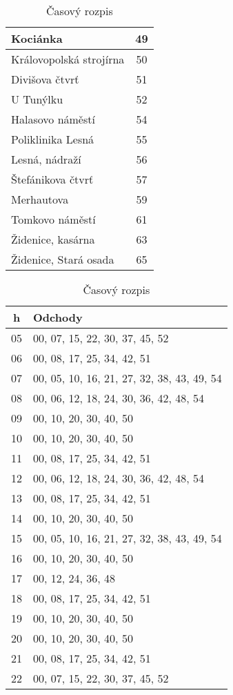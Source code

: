 \begin{table}[h]
\begin{minipage}{0.35\textwidth}
\begin{tabular}{|l|c|}
      Kociánka & 49 \\ \hline
      Královopolská strojírna & 50 \\ \hline
      Divišova čtvrť & 51 \\ \hline
      U Tunýlku & 52 \\ \hline
      Halasovo náměstí & 54 \\ \hline
      Poliklinika Lesná & 55 \\ \hline
      Lesná, nádraží & 56 \\ \hline
      Štefánikova čtvrť & 57 \\ \hline
      Merhautova & 59 \\ \hline
      Tomkovo náměstí & 61 \\ \hline
      Židenice, kasárna & 63 \\ \hline
      Židenice, Stará osada & 65 \\ \hline
    \end{tabular}
    \caption{Rozpis zastávok}      
  \end{minipage}
  \begin{minipage}{0.55\textwidth}
    \centering
    \begin{tabular}{|c|l|}
      \hline
      \textbf{h} & \textbf{Odchody} \\ \hline
      05 & 00, 07, 15, 22, 30, 37, 45, 52 \\ \hline
      06 & 00, 08, 17, 25, 34, 42, 51 \\ \hline
      07 & 00, 05, 10, 16, 21, 27, 32, 38, 43, 49, 54 \\ \hline
      08 & 00, 06, 12, 18, 24, 30, 36, 42, 48, 54 \\ \hline
      09 & 00, 10, 20, 30, 40, 50 \\ \hline
      10 & 00, 10, 20, 30, 40, 50 \\ \hline
      11 & 00, 08, 17, 25, 34, 42, 51 \\ \hline
      12 & 00, 06, 12, 18, 24, 30, 36, 42, 48, 54 \\ \hline
      13 & 00, 08, 17, 25, 34, 42, 51 \\ \hline
      14 & 00, 10, 20, 30, 40, 50 \\ \hline
      15 & 00, 05, 10, 16, 21, 27, 32, 38, 43, 49, 54 \\ \hline
      16 & 00, 10, 20, 30, 40, 50 \\ \hline
      17 & 00, 12, 24, 36, 48 \\ \hline
      18 & 00, 08, 17, 25, 34, 42, 51 \\ \hline
      19 & 00, 10, 20, 30, 40, 50 \\ \hline
      20 & 00, 10, 20, 30, 40, 50 \\ \hline
      21 & 00, 08, 17, 25, 34, 42, 51 \\ \hline
      22 & 00, 07, 15, 22, 30, 37, 45, 52 \\ \hline
    \end{tabular}
    \caption{Časový rozpis}
  \end{minipage}
\end{table}
